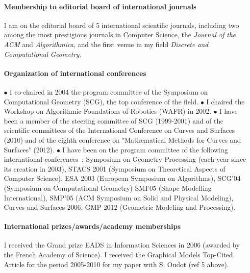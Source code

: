 \paragraph{Membership to editorial board of international journals}   \mbox{}


I am on the editorial board of 5 international scientific journals, including two among the most prestigious  journals in Computer Science, the {\em Journal of the ACM} and  {\em Algorithmica}, and the first venue in my field {\em Discrete and Computational Geometry}. 




\paragraph{Organization of international conferences} \mbox{}


$\bullet$ I co-chaired in 2004 the program committee of the  Symposium on Computational Geometry (SCG), the top conference of the field.
$\bullet$ 
I chaired the Workshop on Algorithmic Foundations of Robotics (WAFR) in 2002.
$\bullet$ 
I have been a member of the steering committee of SCG (1999-2001) and of the scientific committees of the International Conference on Curves and Surfaces (2010) and of  the eighth conference on "Mathematical Methods for Curves and Surfaces" (2012).
$\bullet$ 
I have been on the program committee of  the following international conferences~: Symposium on Geometry Processing (each year since its creation in 2003), 
STACS 2001 (Symposium on Theoretical Aspects of Computer Science),
ESA 2003 (European Symposium on Algorithms),
SCG'04 (Symposium on Computational Geometry)
SMI'05 (Shape Modelling International),
SMP'05 (ACM Symposium on Solid and Physical Modeling),
Curves and Surfaces 2006,
GMP 2012 (Geometric Modeling 
and Processing).

\paragraph{International prizes/awards/academy memberships} \mbox{}
I received the Grand prize EADS in Information Sciences in 2006 (awarded by the French Academy of Science).  I received the Graphical Models Top-Cited Article for the period 2005-2010 for  my paper with S. Oudot (ref 5 above).

